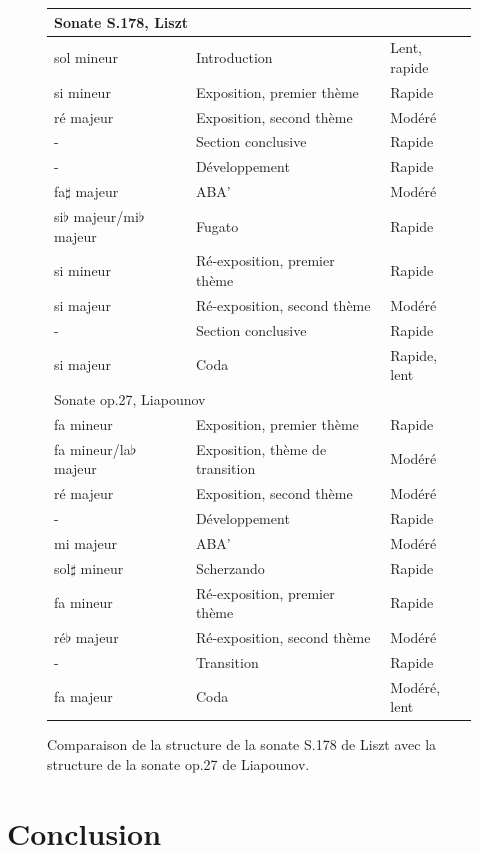\begin{figure}[!ht]
  \begin{bigcenter}
    \scalebox{0.875} {
\begin{tabular}{|l|l|l|}
 \hline
\multicolumn{3}{|l|}{Sonate S.178, Liszt}\\
 \hline
sol mineur & Introduction & Lent, rapide\\
si mineur & Exposition, premier thème & Rapide\\
ré majeur & Exposition, second thème & Modéré\\
- & Section conclusive & Rapide\\
- & Développement & Rapide\\
fa$\sharp$ majeur & ABA' & Modéré\\
si$\flat$ majeur/mi$\flat$ majeur & Fugato & Rapide\\
si mineur & Ré-exposition, premier thème & Rapide\\
si majeur & Ré-exposition, second thème & Modéré\\
- & Section conclusive & Rapide\\
si majeur & Coda & Rapide, lent\\
 \hline
 \hline
\multicolumn{3}{|l|}{Sonate op.27, Liapounov}\\
 \hline
fa mineur & Exposition, premier thème & Rapide\\
fa mineur/la$\flat$ majeur & Exposition, thème de transition & Modéré\\
ré majeur & Exposition, second thème & Modéré \\
- & Développement & Rapide\\
mi majeur & ABA' & Modéré\\
sol$\sharp$ mineur & Scherzando & Rapide\\
fa mineur & Ré-exposition, premier thème & Rapide\\
ré$\flat$ majeur & Ré-exposition, second thème & Modéré\\
- & Transition & Rapide\\
fa majeur & Coda & Modéré, lent\\
 \hline
\end{tabular}
    }
  \end{bigcenter}
  \caption{\label{sonate-liapounov-list2}Comparaison de la structure de la sonate S.178 de Liszt avec la structure de la sonate op.27 de Liapounov.}
\end{figure}

\section{Conclusion}

